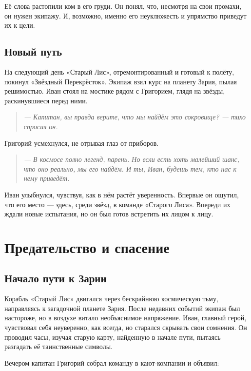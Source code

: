 \documentclass[12pt,a4paper]{book}
\newenvironment{dialogue}{\begin{quote}\itshape}{\end{quote}}
\begin{document}
Её слова растопили ком в его груди. Он понял, что, несмотря на свои промахи, он нужен экипажу. И, возможно, именно его неуклюжесть и упрямство приведут их к цели.

\section*{Новый путь}

На следующий день «Старый Лис», отремонтированный и готовый к полёту, покинул «Звёздный Перекрёсток». Экипаж взял курс на планету Зария, пылая решимостью. Иван стоял на мостике рядом с Григорием, глядя на звёзды, раскинувшиеся перед ними.

\begin{dialogue}
--- Капитан, вы правда верите, что мы найдём это сокровище? --- тихо спросил он.
\end{dialogue}

Григорий усмехнулся, не отрывая глаз от приборов.

\begin{dialogue}
--- В космосе полно легенд, парень. Но если есть хоть малейший шанс, что оно реально, мы его найдём. И ты, Иван, будешь тем, кто нас к нему приведёт.
\end{dialogue}

Иван улыбнулся, чувствуя, как в нём растёт уверенность. Впервые он ощутил, что его место --- здесь, среди звёзд, в команде «Старого Лиса». Впереди их ждали новые испытания, но он был готов встретить их лицом к лицу.

\chapter{Предательство и спасение}

\section*{Начало пути к Зарии}

Корабль «Старый Лис» двигался через бескрайнюю космическую тьму, направляясь к загадочной планете Зария. После недавних событий экипаж был настороже, но в воздухе витало необъяснимое напряжение. Иван, главный герой, чувствовал себя неуверенно, как всегда, но старался скрывать свои сомнения. Он проводил часы, изучая старую карту, найденную в начале пути, пытаясь разгадать её таинственные символы.

Вечером капитан Григорий собрал команду в кают-компании и объявил:
\end{document}
